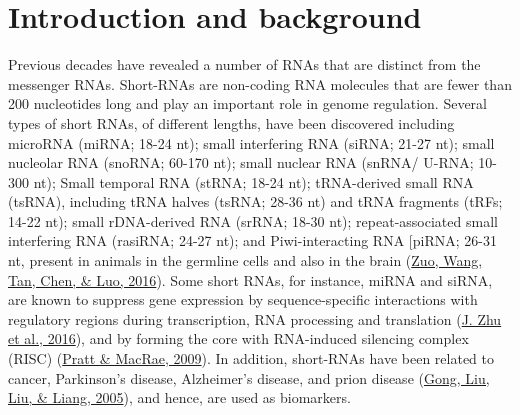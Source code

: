 \documentclass[12pt,twoside]{reedthesis}
\begin{document}
\hypertarget{introduction-and-background}{%
\section{Introduction and background}\label{introduction-and-background}}

Previous decades have revealed a number of RNAs that are distinct from
the messenger RNAs. Short-RNAs are non-coding RNA molecules that are
fewer than 200 nucleotides long and play an important role in genome
regulation. Several types of short RNAs, of different lengths, have been
discovered including microRNA (miRNA; 18-24 nt); small interfering RNA
(siRNA; 21-27 nt); small nucleolar RNA (snoRNA; 60-170 nt); small
nuclear RNA (snRNA/ U-RNA; 10-300 nt); Small temporal RNA (stRNA; 18-24
nt); tRNA-derived small RNA (tsRNA), including tRNA halves (tsRNA; 28-36
nt) and tRNA fragments (tRFs; 14-22 nt); small rDNA-derived RNA (srRNA;
18-30 nt); repeat-associated small interfering RNA (rasiRNA; 24-27 nt);
and Piwi-interacting RNA {[}piRNA; 26-31 nt, present in animals in the
germline cells and also in the brain (\protect\hyperlink{ref-zuo2016}{Zuo, Wang, Tan, Chen, \& Luo, 2016}). Some short RNAs, for
instance, miRNA and siRNA, are known to suppress gene expression by
sequence-specific interactions with regulatory regions during
transcription, RNA processing and translation (\protect\hyperlink{ref-zhu2016}{J. Zhu et al., 2016}), and by forming
the core with RNA-induced silencing complex (RISC) (\protect\hyperlink{ref-pratt2009}{Pratt \& MacRae, 2009}). In
addition, short-RNAs have been related to cancer, Parkinson's disease,
Alzheimer's disease, and prion disease (\protect\hyperlink{ref-gong2005}{Gong, Liu, Liu, \& Liang, 2005}), and hence, are used
as biomarkers.
\end{document}
